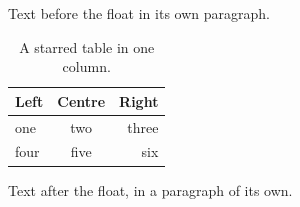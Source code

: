 \documentclass[12pt]{article}
\begin{document}
Text before the float in its own paragraph.

\begin{table}[t]
\centering
\caption{A starred table in one column.}
\begin{tabular}{lcr}\hline Left & Centre & Right\\\hline one & two & three\\ four & five & six\\\hline\end{tabular}
\end{table}

Text after the float, in a paragraph of its own.
\end{document}
